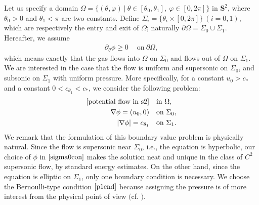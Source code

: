 \documentclass[10pt,a4paper]{amsart}
\numberwithin{equation}{section}
\begin{document}
Let us specify a domain $\Omega=\{(\theta, \varphi)~|~\theta\in[\theta_0,\theta_1],~\varphi \in [0,2\pi]\}$ in $\mathbf{S}^2$, where $\theta_0>0$ and $\theta_1<\pi$ are two constants. Define $\Sigma_i=\{\theta_i\times[0,2\pi]\}~(i=0,1)$, which are respectively the entry and exit of $\Omega$; naturally $\partial\Omega=\Sigma_0\cup\Sigma_1$. Hereafter, we assume 
	\begin{align}\label{h1}
		\partial_{\theta}\phi\geq0 ~\quad \text{on}~\partial\Omega,
	\end{align}
which means exactly that the gas flows into $\Omega$ on $\Sigma_0$ and flows out of $\Omega$ on $\Sigma_1$. We are interested in the case that the flow is uniform and supersonic on $\Sigma_0$, and subsonic on $\Sigma_1$ with uniform pressure. More specifically, for a constant $u_0>c_{*}$ and a constant $0<c_{\theta_1 }<c_{*}$, we consider the following problem:
	\begin{align}\label{p1}
		\eqref{potential flow in s2} \quad &\text{in}~\Omega,\\
		\nabla\phi=(u_0,0) \quad &\text{on} ~\Sigma_0,\label{sigma0con}\\
		|\nabla \phi|=c_{\theta_1 } \quad &\text{on}~\Sigma_1.\label{p1end}
	\end{align}
We remark that the formulation of this boundary value problem is physically natural. Since the flow is supersonic near $\Sigma_0$, i.e., the equation is hyperbolic, our choice of $\phi$ in $\eqref{sigma0con}$ makes the solution neat and unique in the class of $C^2$ supersonic flow, by standard energy estimates. On the other hand, since the equation is elliptic on $\Sigma_1$, only one boundary condition is necessary. We choose the Bernoulli-type condition $\eqref{p1end}$ because assigning the pressure is of more interest from the physical point of view $($cf. \cite{supshockCF}$)$.
\end{document}
